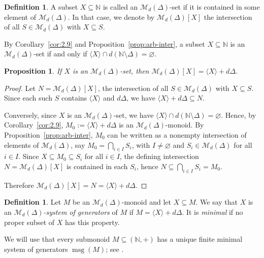 \documentclass[12pt,a4paper]{amsart}
\newtheorem{proposition}[theorem]{Proposition}
\theoremstyle{definition}
\newtheorem{definition}[theorem]{Definition}
\theoremstyle{remark}
\begin{document}
\begin{definition}
A subset $X\subseteq\mathbb{N}$ is called an $\mathcal{M}_d(\Delta)$-set if it is contained in some element of $\mathcal{M}_d(\Delta)$. In that case, we denote by $\mathcal{M}_d(\Delta)[X]$ the intersection of all $S\in\mathcal{M}_d(\Delta)$ with $X\subseteq S$.
\end{definition}

By Corollary~\ref{cor:2.9} and Proposition~\ref{prop:arb-inter}, a subset
$X\subseteq\mathbb N$ is an $\mathcal{M}_d(\Delta)$-set if and only if
$\langle X\rangle\cap d(\mathbb N\setminus\Delta)=\varnothing$.

\begin{proposition}\label{prop:Md-closure}
If $X$ is an $\mathcal{M}_d(\Delta)$-set, then
$\mathcal{M}_d(\Delta)[X]=\langle X\rangle+d\Delta$.
\end{proposition}

\begin{proof}
Let $N=\mathcal{M}_d(\Delta)[X]$, the intersection of all
$S\in\mathcal{M}_d(\Delta)$ with $X\subseteq S$.
Since each such $S$ contains $\langle X\rangle$ and $d\Delta$, we have
$\langle X\rangle+d\Delta\subseteq N$.

Conversely, since $X$ is an $\mathcal{M}_d(\Delta)$-set, we have
$\langle X\rangle\cap d(\mathbb{N}\setminus\Delta)=\varnothing$.
Hence, by Corollary~\ref{cor:2.9},
$M_0:=\langle X\rangle+d\Delta$ is an $\mathcal{M}_d(\Delta)$-monoid.
By Proposition~\ref{prop:arb-inter}, $M_0$ can be written as a nonempty intersection
of elements of $\mathcal{M}_d(\Delta)$, say
$M_0=\bigcap_{i\in I} S_i$, with $I\neq\varnothing$ and
$S_i\in\mathcal{M}_d(\Delta)$ for all $i\in I$.
Since $X\subseteq M_0\subseteq S_i$ for all $i\in I$, the defining intersection
$N=\mathcal{M}_d(\Delta)[X]$ is contained in each $S_i$, hence
$N\subseteq \bigcap_{i\in I} S_i=M_0$.

Therefore $\mathcal{M}_d(\Delta)[X]=N=\langle X\rangle+d\Delta$.
\end{proof}

\begin{definition}
Let $M$ be an $\mathcal{M}_d(\Delta)$-monoid and let $X\subseteq M$. We say that $X$ is an \emph{$\mathcal{M}_d(\Delta)$-system of generators} of $M$ if $M=\langle X\rangle+d\Delta$.
It is \emph{minimal} if no proper subset of $X$ has this property.
\end{definition}

We will use that every submonoid $M\subseteq(\mathbb{N},+)$ has a unique finite minimal system of generators $\operatorname{msg}(M)$; see \cite[Corollary~2.8]{book}.
\end{document}
